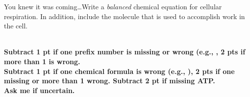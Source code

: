 \question[4]
You knew it was coming\dots Write a \emph{balanced} chemical equation for cellular respiration. In addition, include the molecule that is used to accomplish work in the cell.
 
\\
{\bfseries Subtract 1 pt if one prefix number is missing or wrong (e.g., , 2 pts if more than 1 is wrong. \\
Subtract 1 pt if one chemical formula is wrong (e.g., ), 2 pts if one missing or more than 1 wrong.
Subtract 2 pt if missing ATP.\\Ask me if uncertain.}
\fi 
\vspace*{3\baselineskip}
